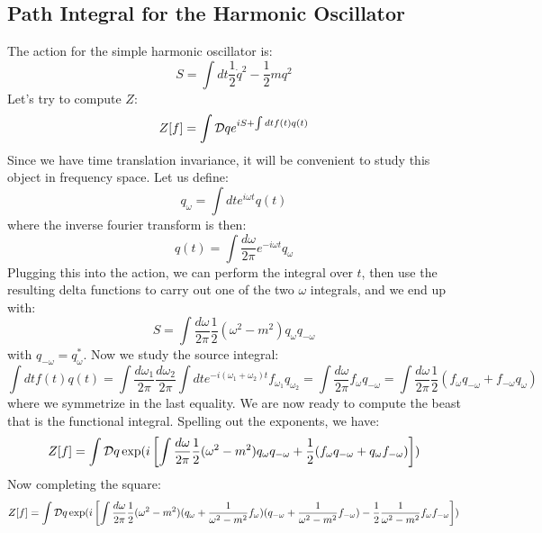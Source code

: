 \subsection{Path Integral for the Harmonic Oscillator}
The action for the simple harmonic oscillator is:
\begin{equation}
    S = \int dt \frac{1}{2}\dot{q}^2 - \frac{1}{2}mq^2
\end{equation}
Let's try to compute $Z$:
\begin{equation}
    Z[f] = \int \mathcal{D} q e^{iS + \int dt f(t)q(t)}
\end{equation}
Since we have time translation invariance, it will be convenient to study this object in frequency space. Let us define:
\begin{equation}
    q_\omega = \int dt e^{i\omega t}q(t)
\end{equation}
where the inverse fourier transform is then:
\begin{equation}
    q(t) = \int \frac{d\omega}{2\pi}e^{-i\omega t}q_\omega
\end{equation}
Plugging this into the action, we can perform the integral over $t$, then use the resulting delta functions to carry out one of the two $\omega$ integrals, and we end up with:
\begin{equation}
    S = \int \frac{d\omega}{2\pi}\frac{1}{2}(\omega^2 - m^2)q_\omega q_{-\omega}
\end{equation}
with $q_{-\omega} = q_\omega^*$. Now we study the source integral:
\begin{equation}
    \int dt f(t) q(t) = \int \frac{d\omega_1}{2\pi}\frac{d\omega_2}{2\pi}\int dt e^{-i(\omega_1 + \omega_2)t}f_{\omega_1}q_{\omega_2} = \int \frac{d\omega}{2\pi}f_\omega q_{-\omega} = \int \frac{d\omega}{2\pi}\frac{1}{2}\left(f_{\omega}q_{-\omega} + f_{-\omega}q_{\omega}\right)
\end{equation}
where we symmetrize in the last equality. We are now ready to compute the beast that is the functional integral. Spelling out the exponents, we have:
\begin{equation}
    Z[f] = \int \mathcal{D} q \exp(i\left[\int \frac{d\omega}{2\pi}\frac{1}{2}(\omega^2 - m^2)q_{\omega}q_{-\omega} + \frac{1}{2}(f_{\omega}q_{-\omega} + q_\omega f_{-\omega})\right])
\end{equation}
Now completing the square:
\begin{equation}
    Z[f] = \int \mathcal{D} q \exp(i\left[\int \frac{d\omega}{2\pi} \frac{1}{2}(\omega^2 - m^2)(q_\omega + \frac{1}{\omega^2 - m^2}f_\omega)(q_{-\omega}  + \frac{1}{\omega^2-m^2}f_{-\omega}) - \frac{1}{2}\frac{1}{\omega^2 - m^2}f_{\omega}f_{-\omega}\right])
\end{equation}
